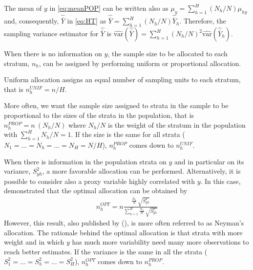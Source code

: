 The mean of $y$ in \eqref{eq:meanPOP} can be written also as 
$\mu_{y}= \sum_{h=1}^H \left({N_h} / {N} \right) \mu_{hy}$
and, consequently, $\hat{\bar{Y}}$ in \eqref{eq:HT} as
$\hat{\bar{Y}} = \sum_{h=1}^H \left( {N_h} / {N} \right) \hat{\bar{Y}}_h$.
Therefore, the sampling variance estimator for $\hat{\bar{Y}}$ is
$\widehat{\text{var}} \left( \hat{\bar{Y}} \right) = \sum_{h=1}^H \left({N_h} / {N} \right)^2 \widehat{\text{var}} \left(\hat{\bar{Y}}_h \right)$.

When there is no information on $y$, the sample size to be allocated to each stratum, $n_h$, can be assigned by performing uniform or proportional allocation.

Uniform allocation assigns an equal number of sampling units to each stratum, that is 
$
n_h^{UNIF}={n}/{H}.
$

More often, we want the sample size assigned to strata in the sample to be proportional to the sizes of the strata in the population, that is
$
n_h^{PROP}=n \ \left( {N_h} / {N} \right)
$
where $N_h/N$ is the weight of the stratum in the population with $\sum_{h=1}^H N_h/N=1$.
If the size is the same for all strata ($N_1=\dots=N_h=\dots=N_H=N/H$), $n_h^{PROP}$ comes down to $n_h^{UNIF}$. 

When there is information in the population strata on $y$ and in particular on its variance, $S_{yh}^2$, a more favorable allocation can be performed.
Alternatively, it is possible to consider also a proxy variable highly correlated with $y$.
In this case, \cite{tschprow1923optimal} demonstrated that the optimal allocation can be obtained by 
\begin{eqnarray*}
	n_h^{OPT}=n \frac{\frac{N_h}{N} \ \sqrt{S_{yh}^2}}{\sum_{h=1}^H \frac{N_h}{N} \ \sqrt{S_{yh}^2}}  \end{eqnarray*}
However, this result, also published by 
\citeauthor{neyman1934optimal} 
(\citeyear{neyman1934optimal}), is more often referred to as Neyman's allocation.
The rationale behind the optimal allocation is that strata with more weight and in which $y$ has much more variability need many more observations to reach better estimates. 
If the variance is the same in all the strata ($S_1^2=\dots=S_h^2=\dots=S_H^2$), $n_h^{OPT}$ comes down to $n_h^{PROP}$. 

